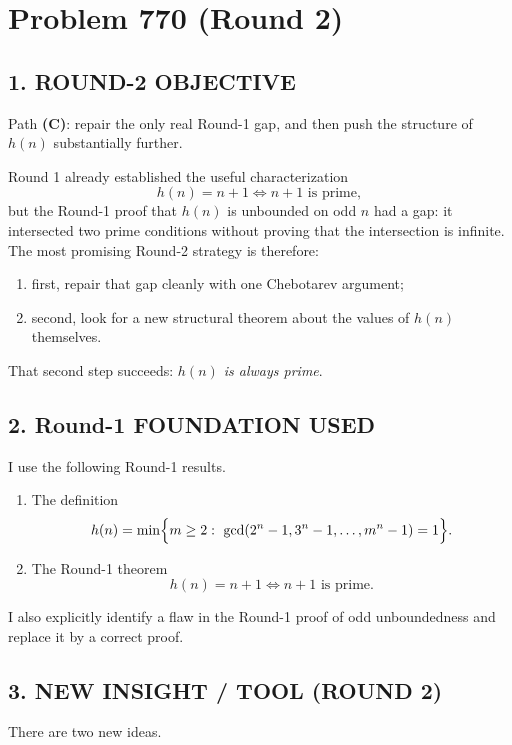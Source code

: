 
\section*{Problem 770 (Round 2)}

\subsection*{1. ROUND-2 OBJECTIVE}

Path \textbf{(C)}: repair the only real Round-1 gap, and then push the structure of $h(n)$ substantially further.

Round 1 already established the useful characterization
\[
h(n)=n+1 \iff n+1 \text{ is prime},
\]
but the Round-1 proof that $h(n)$ is unbounded on odd $n$ had a gap: it intersected two prime conditions without proving that the intersection is infinite.
The most promising Round-2 strategy is therefore:

\begin{enumerate}
\item first, repair that gap cleanly with one Chebotarev argument;
\item second, look for a new structural theorem about the values of $h(n)$ themselves.
\end{enumerate}

That second step succeeds: \emph{$h(n)$ is always prime}.

\subsection*{2. Round-1 FOUNDATION USED}

I use the following Round-1 results.

\begin{enumerate}
\item The definition
\[
h(n)=\min\Bigl\{m\ge 2:\ \gcd(2^n-1,3^n-1,\dots,m^n-1)=1\Bigr\}.
\]
\item The Round-1 theorem
\[
h(n)=n+1 \iff n+1 \text{ is prime}.
\]
\end{enumerate}

I also explicitly identify a flaw in the Round-1 proof of odd unboundedness and replace it by a correct proof.

\subsection*{3. NEW INSIGHT / TOOL (ROUND 2)}

There are two new ideas.

